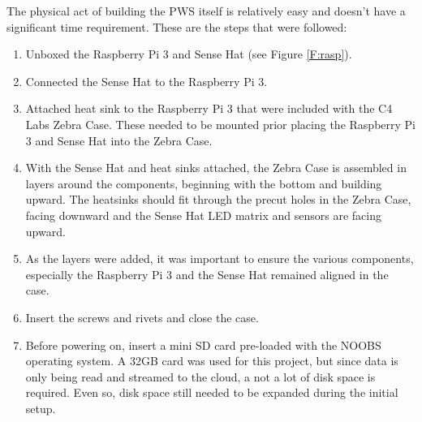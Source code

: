 \documentclass[sigconf]{acmart}
\begin{document}
The physical act of building the PWS itself is relatively easy and doesn't have a significant time requirement. These are the steps that were followed:
\begin{enumerate}
\item Unboxed the Raspberry Pi 3 and Sense Hat (see Figure \ref{F:rasp}).
\item Connected the Sense Hat to the Raspberry Pi 3.
\item Attached heat sink to the Raspberry Pi 3 that were included with the C4 Labs Zebra Case. These needed to be mounted prior placing the Raspberry Pi 3 and Sense Hat into the Zebra Case.
\item With the Sense Hat and heat sinks attached, the Zebra Case is assembled in layers around the components, beginning with the bottom and building upward. The heatsinks should fit through the precut holes in the Zebra Case, facing downward and the Sense Hat LED matrix and sensors are facing upward.
\item As the layers were added, it was important to ensure the various components, especially the Raspberry Pi 3 and the Sense Hat remained aligned in the case.
\item Insert the screws and rivets and close the case.
\item Before powering on, insert a mini SD card pre-loaded with the NOOBS operating system. A 32GB card was used for this project, but since data is only being read and streamed to the cloud, a not a lot of disk space is required. Even so, disk space still needed to be expanded during the initial setup.
\end{enumerate}
\end{document}
